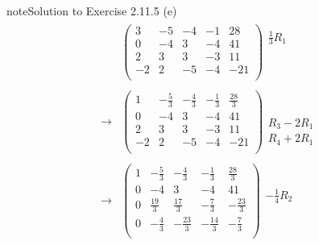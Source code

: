 \documentclass[letterpaper,10pt,english]{jupyterBook}
\begin{document}
\begin{sphinxadmonition}{note}{Solution to Exercise 2.11.5}
\sphinxAtStartPar
(e)
\begin{equation*}
\begin{split} \begin{align*} 
    & \left( \begin{array}{cccc|c} 
         3 & -5 & -4 & -1 & 28 \\ 
         0 & -4 & 3 & -4 & 41 \\ 
         2 & 3 & 3 & -3 & 11 \\ 
         -2 & 2 & -5 & -4 & -21 \\ 
    \end{array} \right) 
    \begin{array}{l} \frac{1}{3} R_{1}\\ \phantom{x} \\ \phantom{x} \\ \phantom{x} \end{array} \\ \\ 
    \longrightarrow 
    & \left( \begin{array}{cccc|c} 
         1 & - \frac{5}{3} & - \frac{4}{3} & - \frac{1}{3} & \frac{28}{3} \\ 
         0 & -4 & 3 & -4 & 41 \\ 
         2 & 3 & 3 & -3 & 11 \\ 
         -2 & 2 & -5 & -4 & -21 \\ 
    \end{array} \right) 
    \begin{array}{l} \phantom{x} \\ \phantom{x} \\ R_{3} - 2 R_{1} \\ R_{4} + 2 R_{1}\end{array} \\ \\ 
    \longrightarrow 
    & \left( \begin{array}{cccc|c} 
         1 & - \frac{5}{3} & - \frac{4}{3} & - \frac{1}{3} & \frac{28}{3} \\ 
         0 & -4 & 3 & -4 & 41 \\ 
         0 & \frac{19}{3} & \frac{17}{3} & - \frac{7}{3} & - \frac{23}{3} \\ 
         0 & - \frac{4}{3} & - \frac{23}{3} & - \frac{14}{3} & - \frac{7}{3} \\ 
    \end{array} \right) 
    \begin{array}{l} \phantom{x} \\ - \frac{1}{4} R_{2}\\ \phantom{x} \\ \phantom{x} \end{array} \\ \\ 

\end{align*}
\end{split}
\end{equation*}
\end{sphinxadmonition}
\end{document}
